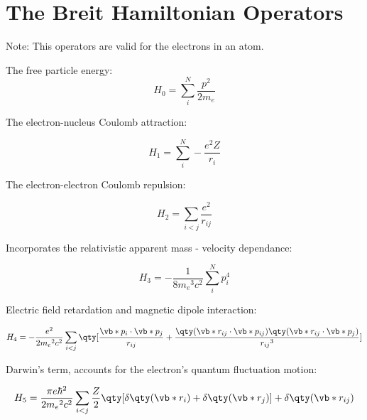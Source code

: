 

\chapter{The Breit Hamiltonian Operators}\label{ap:Breit}

Note: This operators are valid for the electrons in an atom.


The free particle energy:
\begin{equation}
    \displaystyle H_0=\sum_i^N \frac{p^2}{2m_e}
\end{equation}

The electron-nucleus Coulomb attraction:

\begin{equation}
    \displaystyle H_1 = \sum_i^N -\frac{e^2 Z}{r_i}
\end{equation}

The electron-electron Coulomb repulsion:

\begin{equation}
    H_2 = \displaystyle \sum_{i<j}\frac{e^2}{r_{ij}}
\end{equation}

Incorporates the relativistic apparent mass  - velocity dependance:

\begin{equation}
    H_3 = -\frac{1}{8 {m_e}^3 c^2}\sum_{i}^{N} p_i^4
\end{equation}


Electric field retardation and magnetic dipole interaction:

\begin{equation}
   H_4= -\frac{e^2}{2{m_e}^2 c^2}\sum_{i<j} \qty[\frac{\vb*{p}_i\cdot \vb*{p}_j}{r_{ij}}+\frac{\qty(\vb*{r_{ij}}\cdot\vb*{p}_{ij})\qty(\vb*{r}_{ij}\cdot\vb*{p}_j)}{{r_{ij}}^3}]
\end{equation}

Darwin's term, accounts for the electron's quantum fluctuation motion:

\begin{equation}
   H_5=\frac{\pi e \hbar^2}{2{m_e}^2c^2}\sum_{i<j} \frac{Z}{2}\qty[\delta\qty(\vb*{r}_i)+\delta\qty(\vb*{r}_j)]+\delta\qty(\vb*{r}_{ij})                           
\end{equation}

